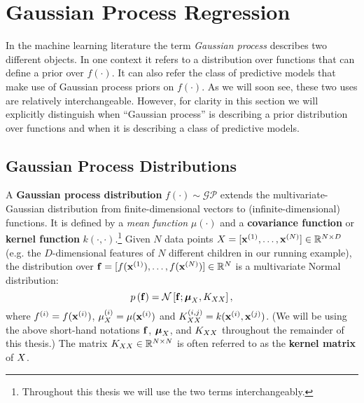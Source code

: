\section{Gaussian Process Regression}
\label{sec:gps}

In the machine learning literature the term \emph{Gaussian process} describes two different objects.
In one context it refers to a distribution over functions that can define a prior over $f(\cdot)$.
It can also refer the class of predictive models that make use of Gaussian process priors on $f(\cdot)$.
As we will soon see, these two uses are relatively interchangeable.
However, for clarity in this section we will explicitly distinguish when ``Gaussian process'' is describing a prior distribution over functions and when it is describing a class of predictive models.

\subsection{Gaussian Process Distributions}
A {\bf Gaussian process distribution} $f(\cdot) \sim \mathcal{GP}$ extends the multivariate-Gaussian distribution from finite-dimensional vectors to (infinite-dimensional) functions.
It is defined by a \emph{mean function} $\mu(\cdot)$ and a {\bf covariance function} or {\bf kernel function} $k(\cdot, \cdot)$.\footnote{
  Throughout this thesis we will use the two terms interchangeably.
}
Given $N$ data points $X = [ \mathbf{x}^{(1)}, \ldots, \mathbf{x}^{(N)} ] \in \mathbb{R}^{N \times D}$ (e.g. the $D$-dimensional features of $N$ different children in our running example),
the distribution over $\mathbf{f} = [ f(\mathbf{x}^{(1)}), \ldots, f(\mathbf{x}^{(N)}) ] \in \mathbb{R}^{N}$ is a multivariate Normal distribution:
\begin{equation}
 p \left( \bfn \right) = \normaldist{ \bfn ; \bmu_\bX}{ \bK_{\bX\bX} },
 \label{eqn:prior_finite}
\end{equation}
where $f^{(i)} = f(\mathbf{x}^{(i)})$, $\mu^{(i)}_{X} = \mu( \mathbf{x}^{(i)} )$ and $K_{XX}^{(i,j)} = k(\mathbf{x}^{(i)}, \mathbf{x}^{(j)})$.
(We will be using the above short-hand notations $\mathbf{f}$, $\boldsymbol{\mu}_{X}$, and $K_{XX}$ throughout the remainder of this thesis.)
The matrix $K_{XX} \in \mathbb{R}^{N \times N}$ is often referred to as the {\bf kernel matrix} of $X$.

